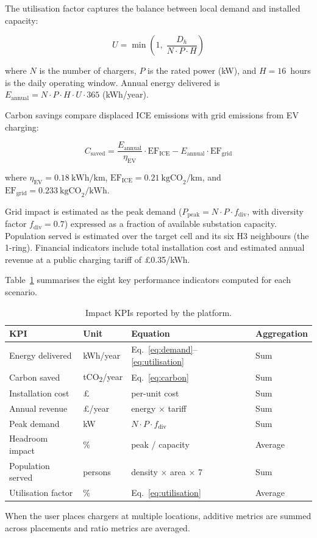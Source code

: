 The utilisation factor captures the balance between local demand and installed capacity:

\begin{equation}
\label{eq:utilisation}
U = \min\!\left(1,\; \frac{D_h}{N \cdot P \cdot H}\right)
\end{equation}

\noindent where $N$ is the number of chargers, $P$ is the rated power (kW), and $H = 16$~hours is the daily operating window. Annual energy delivered is $E_{\text{annual}} = N \cdot P \cdot H \cdot U \cdot 365$ (kWh/year).

Carbon savings compare displaced ICE emissions with grid emissions from EV charging:

\begin{equation}
\label{eq:carbon}
C_{\text{saved}} = \frac{E_{\text{annual}}}{\eta_{\text{EV}}} \cdot \text{EF}_{\text{ICE}} - E_{\text{annual}} \cdot \text{EF}_{\text{grid}}
\end{equation}

\noindent where $\eta_{\text{EV}} = 0.18~\text{kWh/km}$, $\text{EF}_{\text{ICE}} = 0.21~\text{kgCO}_2\text{/km}$, and $\text{EF}_{\text{grid}} = 0.233~\text{kgCO}_2\text{/kWh}$.

Grid impact is estimated as the peak demand ($P_{\text{peak}} = N \cdot P \cdot f_{\text{div}}$, with diversity factor $f_{\text{div}} = 0.7$) expressed as a fraction of available substation capacity. Population served is estimated over the target cell and its six H3 neighbours (the 1-ring). Financial indicators include total installation cost and estimated annual revenue at a public charging tariff of \pounds0.35/kWh.

Table~\ref{tab:kpis} summarises the eight key performance indicators computed for each scenario.

\begin{table}[htbp]
\centering
\caption{Impact KPIs reported by the platform.}
\label{tab:kpis}
\small
\begin{tabular}{llll}
\toprule
\textbf{KPI} & \textbf{Unit} & \textbf{Equation} & \textbf{Aggregation} \\
\midrule
Energy delivered & kWh/year & Eq.~\ref{eq:demand}--\ref{eq:utilisation} & Sum \\
Carbon saved & tCO\textsubscript{2}/year & Eq.~\ref{eq:carbon} & Sum \\
Installation cost & \pounds & per-unit cost & Sum \\
Annual revenue & \pounds/year & energy $\times$ tariff & Sum \\
Peak demand & kW & $N \cdot P \cdot f_{\text{div}}$ & Sum \\
Headroom impact & \% & peak / capacity & Average \\
Population served & persons & density $\times$ area $\times$ 7 & Sum \\
Utilisation factor & \% & Eq.~\ref{eq:utilisation} & Average \\
\bottomrule
\end{tabular}
\end{table}

When the user places chargers at multiple locations, additive metrics are summed across placements and ratio metrics are averaged.
